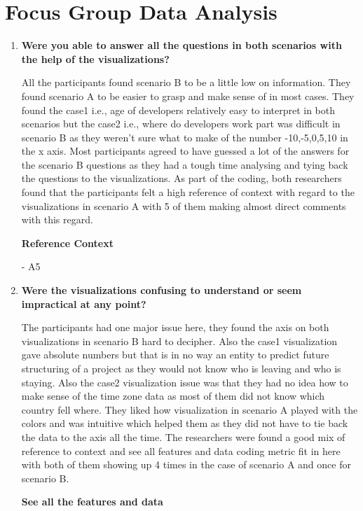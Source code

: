\documentclass[double,12pt]{beavtex}
\begin{document}
\section{Focus Group Data Analysis}
\begin{enumerate}
\item \textbf{Were you able to answer all the questions in both scenarios with the help of the visualizations?}

All the participants found scenario B to be a little low on information. They found scenario A to be easier to grasp and make sense of in most cases. They found the case1 i.e., age of developers relatively easy to interpret in both scenarios but the case2 i.e., where do developers work part was difficult in scenario B as they weren't sure what to make of the number -10,-5,0,5,10 in the x axis. Most participants agreed to have guessed a lot of the answers for the scenario B questions as they had a tough time analysing and tying back the questions to the visualizations.
As part of the coding, both researchers found that the participants felt a high reference of context with regard to the visualizations in scenario A with 5 of them making almost direct comments with this regard.

\textbf{Reference Context}

{\em {}}- A5

\item \textbf{Were the visualizations confusing to understand or seem impractical at any point?}

The participants had one major issue here, they found the axis on both visualizations in scenario B hard to decipher. Also the case1 visualization gave absolute numbers but that is in no way an entity to predict future structuring of a project as they would not know who is leaving and who is staying. Also the case2 visualization issue was that they had no idea how to make sense of the time zone data as most of them did not know which country fell where. They liked how visualization in scenario A played with the colors and was intuitive which helped them as they did not have to tie back the data to the axis all the time. The researchers were found a good mix of reference to context and see all features and data coding metric fit in here with both of them showing up 4 times in the case of scenario A and once for scenario B.

\textbf{See all the features and data}


\end{enumerate}
\end{document}
